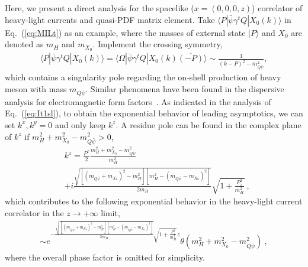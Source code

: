 \documentclass[a4paper,11pt]{article}
\begin{document}
Here, we present a direct analysis for the spacelike ($x=(0,0,0,z)$) correlator of heavy-light currents and quasi-PDF matrix element. Take $\langle P|\bar{\psi} \gamma^t Q |X_0(k) \rangle$ in Eq.~(\ref{eq:MILt}) as an example, where the masses of external state $|P\rangle$ and $X_0$ are denoted as $m_H$ and $m_{X_0}$. Implement the crossing symmetry, 
\begin{align}
\langle P|\bar{\psi} \gamma^t Q |X_0(k) \rangle = \langle \Omega|\bar{\psi} \gamma^t Q |X_0(k)\overline{(-P)} \rangle  \sim \frac{1}{(k-P)^2 - m^2_{Q\bar{\psi}}} , 
\end{align}
which contains a singularity pole regarding the on-shell production of heavy meson with mass $m_{Q\bar{\psi}}$. Similar phenomena have been found in the dispersive analysis for electromagnetic form factors~\cite{Lin:2021umz}. As indicated in the analysis of Eq.~(\ref{eq:It1sl}), to obtain the exponential behavior of leading asymptotics, we can set $k^x,k^y=0$ and only keep $k^z$. A residue pole can be found in the complex plane of $k^z$ if $m_{H}^2+m_{X_0}^2-m_{Q\bar{\psi}}^2>0$,
\begin{align}
&k^z = \frac{P^z}{2} \frac{m_{H}^2+m_{X_0}^2-m_{Q\bar{\psi}}^2}{m_{H}^2} \nonumber\\
&+ i \frac{\sqrt{\left[\left(m_{Q\bar{\psi}}+m_{X_0}\right)^2-m_H^2\right]\left[m_H^2-\left(m_{Q\bar{\psi}}-m_{X_0}\right)^2\right]}}{2 m_H} \sqrt{1+\frac{P_z^2}{m_H^2}}  \ ,
\end{align}
which contributes to the following exponential behavior in the heavy-light current correlator in the $z\rightarrow +\infty$ limit,
\begin{align}
\sim e^{-\frac{\sqrt{\left[\left(m_{Q \bar{\psi}}+m_{X_0}\right)^2-m_H^2\right]\left[m_H^2-\left(m_{Q\bar{\psi}} -m_{X_0}\right)^2\right]}}{2 m_H} \sqrt{1+\frac{P_z^2}{m_H^2}} z} \theta(m_{H}^2+m_{X_0}^2-m_{Q\bar{\psi}}^2) \ ,
\end{align}
where the overall phase factor is omitted for simplicity. 
\end{document}
